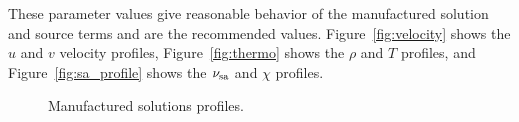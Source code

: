 These parameter values give reasonable behavior of the manufactured
solution and source terms and are the recommended values.
Figure~\ref{fig:velocity} shows the $u$ and $v$ velocity profiles, Figure~\ref{fig:thermo} shows the $\rho$ and $T$ profiles, and Figure~\ref{fig:sa_profile} shows the $\nu_{\mathrm{sa}}$ and $\chi$ profiles.
%
\begin{figure}[htp]
\begin{center}
\end{center}
\vspace{-15pt}
\caption{Manufactured solutions profiles.}
\end{figure}

%
